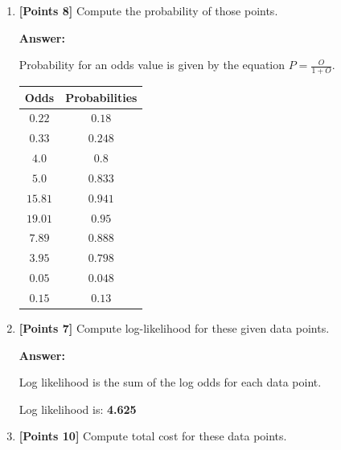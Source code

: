 \documentclass[12pt]{article}
\begin{document}
\begin{enumerate}
\begin{enumerate}
              \item \textbf{[Points 8]} Compute the probability of those points.

                    \textbf{Answer:}

                    Probability for an odds value is given by the equation $P =
                        \frac{O}{1 + O}$.

                    \begin{table}[h]
                        \centering
                        \begin{tabular}{c|c}
                            \textbf{Odds} & \textbf{Probabilities} \\
                            \hline
                            $0.22$        & $0.18$                 \\
                            $0.33$        & $0.248$                \\
                            $4.0$         & $0.8$                  \\
                            $5.0$         & $0.833$                \\
                            $15.81$       & $0.941$                \\
                            $19.01$       & $0.95$                 \\
                            $7.89$        & $0.888$                \\
                            $3.95$        & $0.798$                \\
                            $0.05$        & $0.048$                \\
                            $0.15$        & $0.13$                 \\
                        \end{tabular}
                    \end{table}
                    \newpage

              \item \textbf{[Points 7]} Compute log-likelihood for these given
                    data points.

                    \textbf{Answer:}

                    Log likelihood is the sum of the log odds for each data
                    point.

                    Log likelihood is: \textbf{4.625}
              \item \textbf{[Points 10]} Compute total cost for these data
                    points.


\end{enumerate}
\end{enumerate}
\end{document}
